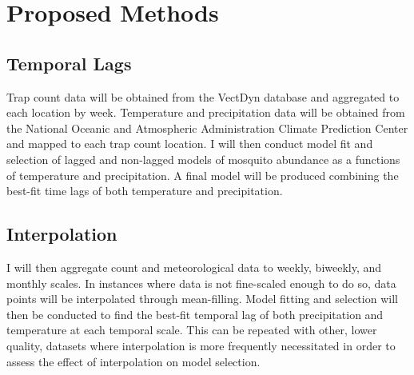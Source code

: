 \documentclass[11pt, a4paper]{article}
\begin{document}
%	
%	
%	

\section{Proposed Methods}

\subsection{Temporal Lags}
Trap count data will be obtained from the VectDyn database and aggregated to each location by week. Temperature and precipitation data will be obtained from the National Oceanic and Atmospheric Administration Climate Prediction Center and mapped to each trap count location. I will then conduct model fit and selection of lagged and non-lagged models of mosquito abundance as a functions of temperature and precipitation. A final model will be produced combining the best-fit time lags of both temperature and precipitation.


\subsection{Interpolation}
I will then aggregate count and meteorological data to weekly, biweekly, and monthly scales. In instances where data is not fine-scaled enough to do so, data points will be interpolated through mean-filling. Model fitting and selection will then be conducted to find the best-fit temporal lag of both precipitation and temperature at each temporal scale. This can be repeated with other, lower quality, datasets where interpolation is more frequently necessitated in order to assess the effect of interpolation on model selection.
\end{document}
